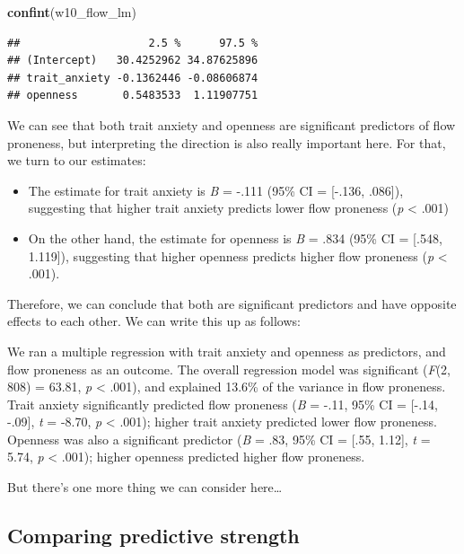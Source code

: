 \documentclass[
]{book}
\newenvironment{Shaded}{\begin{snugshade}}{\end{snugshade}}
\newcommand{\FunctionTok}[1]{\textcolor[rgb]{0.13,0.29,0.53}{\textbf{#1}}}
\newcommand{\NormalTok}[1]{#1}
\providecommand{\tightlist}{%
  \setlength{\itemsep}{0pt}\setlength{\parskip}{0pt}}
\begin{document}
\begin{Shaded}
\begin{Highlighting}[]
\FunctionTok{confint}\NormalTok{(w10\_flow\_lm)}
\end{Highlighting}
\end{Shaded}

\begin{verbatim}
##                    2.5 %      97.5 %
## (Intercept)   30.4252962 34.87625896
## trait_anxiety -0.1362446 -0.08606874
## openness       0.5483533  1.11907751
\end{verbatim}

We can see that both trait anxiety and openness are significant predictors of flow proneness, but interpreting the direction is also really important here. For that, we turn to our estimates:

\begin{itemize}
\tightlist
\item
  The estimate for trait anxiety is \emph{B} = -.111 (95\% CI = {[}-.136, .086{]}), suggesting that higher trait anxiety predicts lower flow proneness (\emph{p} \textless{} .001)
\item
  On the other hand, the estimate for openness is \emph{B} = .834 (95\% CI = {[}.548, 1.119{]}), suggesting that higher openness predicts higher flow proneness (\emph{p} \textless{} .001).
\end{itemize}

Therefore, we can conclude that both are significant predictors and have opposite effects to each other. We can write this up as follows:

We ran a multiple regression with trait anxiety and openness as predictors, and flow proneness as an outcome. The overall regression model was significant (\emph{F}(2, 808) = 63.81, \emph{p} \textless{} .001), and explained 13.6\% of the variance in flow proneness. Trait anxiety significantly predicted flow proneness (\emph{B} = -.11, 95\% CI = {[}-.14, -.09{]}, \emph{t} = -8.70, \emph{p} \textless{} .001); higher trait anxiety predicted lower flow proneness. Openness was also a significant predictor (\emph{B} = .83, 95\% CI = {[}.55, 1.12{]}, \emph{t} = 5.74, \emph{p} \textless{} .001); higher openness predicted higher flow proneness.

But there's one more thing we can consider here\ldots{}

\subsection{Comparing predictive strength}\label{comparing-predictive-strength}
\end{document}
